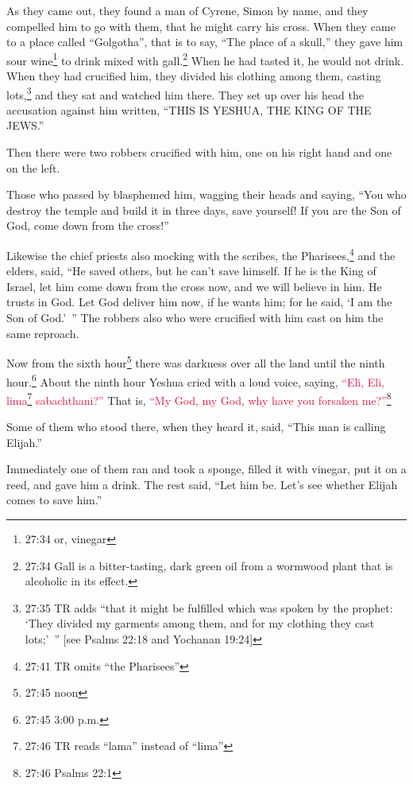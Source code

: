 \myverse{}As they came out, they found a man of Cyrene, Simon by name,
and they compelled him to go with them, that he might carry his cross.
\myverse{}When they came to a place called “Golgotha”, that is to say, “The place of
a skull,”
\myverse{}they gave him sour wine\footnote{27:34 or, vinegar} to drink mixed with gall.\footnote{27:34 Gall is a bitter-tasting, dark green oil from a wormwood plant that is alcoholic in its effect.}
When he had tasted it, he would not drink.
\myverse{}When they had crucified him, they divided his clothing among them, casting
lots,\footnote{27:35 TR adds “that it might be fulfilled which was spoken by the prophet: ‘They divided my garments
	among them, and for my clothing they cast lots;’ ” [see
	Psalms 22:18 and
	Yochanan 19:24]}
\myverse{}and they sat and watched him there.
\myverse{}They set up over his head the accusation against him written, “THIS IS YESHUA,
THE KING OF THE JEWS.”

\myverse{}Then there were two robbers crucified with him, one on his right
hand and one on the left.

\myverse{}Those who passed by blasphemed him, wagging their heads
\myverse{}and saying, “You who destroy the temple and build it in three days, save
yourself! If you are the Son of God, come down from the cross!”

\myverse{}Likewise the chief priests also mocking with the scribes, the
Pharisees,\footnote{27:41 TR omits “the Pharisees”} and the elders, said,
\myverse{}“He saved others, but he can’t save himself. If he is the King of Israel,
let him come down from the cross now, and we will believe in him.
\myverse{}He trusts in God. Let God deliver him now, if he wants him; for he said,
‘I am the Son of God.’ ”
\myverse{}The robbers also who were crucified with him cast on him the same reproach.

\myverse{}Now from the sixth hour\footnote{27:45 noon} there was darkness over all the land until the ninth hour.\footnote{27:45 3:00 p.m.}
\myverse{}About the ninth hour Yeshua cried with a loud voice, saying,
\textcolor{crimson}{“Eli, Eli, lima}\footnote{27:46 TR reads “lama” instead of “lima”}
\textcolor{crimson}{sabachthani?”
} That is,
\textcolor{crimson}{“My God, my God, why have you forsaken me?”}\footnote{27:46 Psalms 22:1}

\myverse{}Some of them who stood there, when they heard it, said, “This
man is calling Elijah.”

\myverse{}Immediately one of them ran and took a sponge, filled it with
vinegar, put it on a reed, and gave him a drink.
\myverse{}The rest said, “Let him be. Let’s see whether Elijah comes to save him.”

